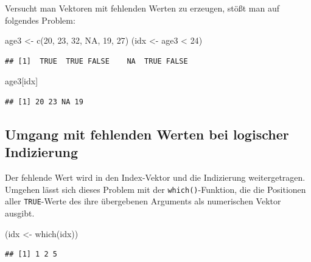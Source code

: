 \documentclass[
]{book}
\newenvironment{Shaded}{\begin{snugshade}}{\end{snugshade}}
\newcommand{\ConstantTok}[1]{\textcolor[rgb]{0.00,0.00,0.00}{#1}}
\newcommand{\DecValTok}[1]{\textcolor[rgb]{0.00,0.00,0.81}{#1}}
\newcommand{\FunctionTok}[1]{\textcolor[rgb]{0.00,0.00,0.00}{#1}}
\newcommand{\NormalTok}[1]{#1}
\newcommand{\OtherTok}[1]{\textcolor[rgb]{0.56,0.35,0.01}{#1}}
\newcommand{\SpecialCharTok}[1]{\textcolor[rgb]{0.00,0.00,0.00}{#1}}
\begin{document}
Versucht man Vektoren mit fehlenden Werten zu erzeugen, stößt man auf folgendes Problem:

\begin{Shaded}
\begin{Highlighting}[]
\NormalTok{age3 }\OtherTok{\textless{}{-}}  \FunctionTok{c}\NormalTok{(}\DecValTok{20}\NormalTok{, }\DecValTok{23}\NormalTok{, }\DecValTok{32}\NormalTok{, }\ConstantTok{NA}\NormalTok{, }\DecValTok{19}\NormalTok{, }\DecValTok{27}\NormalTok{)}
\NormalTok{(idx }\OtherTok{\textless{}{-}}\NormalTok{ age3 }\SpecialCharTok{\textless{}} \DecValTok{24}\NormalTok{)}
\end{Highlighting}
\end{Shaded}

\begin{verbatim}
## [1]  TRUE  TRUE FALSE    NA  TRUE FALSE
\end{verbatim}

\begin{Shaded}
\begin{Highlighting}[]
\NormalTok{age3[idx]}
\end{Highlighting}
\end{Shaded}

\begin{verbatim}
## [1] 20 23 NA 19
\end{verbatim}

\hypertarget{umgang-mit-fehlenden-werten-bei-logischer-indizierung}{%
\subsection{Umgang mit fehlenden Werten bei logischer Indizierung}\label{umgang-mit-fehlenden-werten-bei-logischer-indizierung}}

Der fehlende Wert wird in den Index-Vektor und die Indizierung weitergetragen.\\
Umgehen lässt sich dieses Problem mit der \texttt{which()}-Funktion, die die Positionen aller \texttt{TRUE}-Werte des ihre übergebenen Arguments als numerischen Vektor ausgibt.

\begin{Shaded}
\begin{Highlighting}[]
\NormalTok{(idx }\OtherTok{\textless{}{-}} \FunctionTok{which}\NormalTok{(idx))}
\end{Highlighting}
\end{Shaded}

\begin{verbatim}
## [1] 1 2 5
\end{verbatim}
\end{document}
